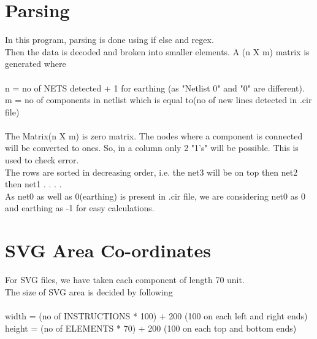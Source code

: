 \documentclass{scrreprt}
\begin{document}
\section{Parsing}
$ $
\\
In this program, parsing is done using if else and regex.\\
Then the data is decoded and broken into smaller elements. A (n X m) matrix is generated where\\
\\ 
\indent n = no of NETS detected + 1 for earthing (as "Netlist 0" and "0" are different). \\
\indent	m = no of components in netlist which is equal to(no of new lines detected in .cir file)\\
\\
The Matrix(n X m) is zero matrix. The nodes where a component is connected will be converted to ones. So, in a column only 2 "1's" will be possible. This is used to check error. \\
The rows are sorted in decreasing order, i.e. the net3 will be on top then net2 then net1  . . . .\\
As net0 as well as 0(earthing) is present in .cir file, we are considering net0 as 0 and earthing as -1 for easy calculations.\\
$ $

\section{SVG Area Co-ordinates}
$ $
\\
For SVG files, we have taken each component of length 70 unit.\\
The size of SVG area is decided by following 
\\
\\ 
\indent width = (no of INSTRUCTIONS * 100) + 200 (100 on each left and right ends)\\
\indent	height = (no of ELEMENTS * 70) + 200 (100 on each top and bottom ends)\\
\\
\end{document}

